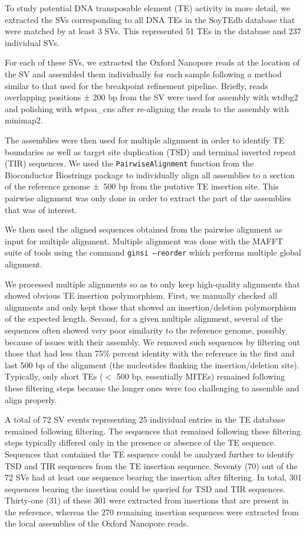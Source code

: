 \documentclass[12pt]{article}
\begin{document}
To study potential DNA transposable element (TE) activity in more detail, we extracted the SVs corresponding to all DNA TEs in the SoyTEdb database \citep{soytedb} that were matched by at least 3 SVs. 
This represented 51 TEs in the database and 237 individual SVs.

For each of these SVs, we extracted the Oxford Nanopore reads at the location of the SV and assembled them individually for each sample following a method similar to that used for the breakpoint refinement pipeline.
Briefly, reads overlapping positions ± 200 bp from the SV were used for assembly with wtdbg2 and polishing with wtpoa\_cns after re-aligning the reads to the assembly with minimap2.

The assemblies were then used for multiple alignment in order to identify TE boundaries as well as target site duplication (TSD) and terminal inverted repeat (TIR) sequences.
We used the \texttt{PairwiseAlignment} function from the Bioconductor Biostrings package \citep{biostrings} to individually align all assemblies to a section of the reference genome ±~500 bp from the putative TE insertion site.
This pairwise alignment was only done in order to extract the part of the assemblies that was of interest.

We then used the aligned sequences obtained from the pairwise alignment as input for multiple alignment.
Multiple alignment was done with the MAFFT \citep{mafft} suite of tools using the command \texttt{ginsi --reorder} which performs multiple global alignment.

We processed multiple alignments so as to only keep high-quality alignments that showed obvious TE insertion polymorphism.
First, we manually checked all alignments and only kept those that showed an insertion/deletion polymorphism of the expected length.
Second, for a given multiple alignment, several of the sequences often showed very poor similarity to the reference genome, possibly because of issues with their assembly.
We removed such sequences by filtering out those that had less than 75\% percent identity with the reference in the first and last 500 bp of the alignment (the nucleotides flanking the insertion/deletion site).
Typically, only short TEs ($<$ 500 bp, essentially MITEs) remained following these filtering steps because the longer ones were too challenging to assemble and align properly.

A total of 72 SV events representing 25 individual entries in the TE database remained following filtering.
The sequences that remained following these filtering steps typically differed only in the presence or absence of the TE sequence.
Sequences that contained the TE sequence could be analyzed further to identify TSD and TIR sequences from the TE insertion sequence.
Seventy (70) out of the 72 SVs had at least one sequence bearing the insertion after filtering.
In total, 301 sequences bearing the insertion could be queried for TSD and TIR sequences.
Thirty-one (31) of these 301 were extracted from insertions that are present in the reference, whereas the 270 remaining insertion sequences were extracted from the local assemblies of the Oxford Nanopore reads.
\end{document}
